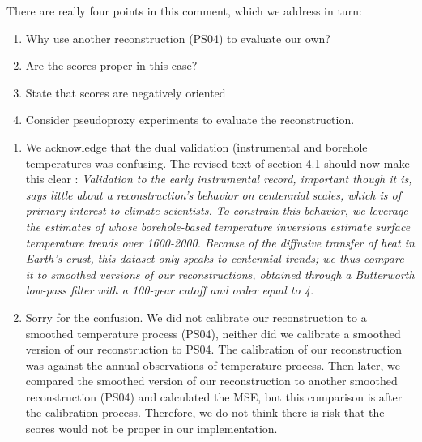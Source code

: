 \documentclass[11pt]{article}
\begin{document}
\begin{itemize}
There are really four points in this comment, which we address in turn:
\begin{enumerate}
\item Why use another reconstruction (PS04) to evaluate our own? 
\item Are the scores proper in this case? 
\item State that scores are negatively oriented
\item Consider pseudoproxy experiments to evaluate the reconstruction. 
\end{enumerate}
\begin{enumerate}
    \item  We acknowledge that the dual validation (instrumental and borehole temperatures was confusing. The revised text of section 4.1 should now make this clear : {\it Validation to the early instrumental record, important though it is, says little about a reconstruction's behavior on centennial scales, which is of primary interest to climate scientists. To constrain this behavior, we leverage the estimates of \citet[hereafter, PS04]{Pollack2004} whose borehole-based
temperature inversions estimate surface temperature trends over 1600-2000. Because of the diffusive transfer of heat in Earth's crust, this dataset only speaks to centennial trends; we thus compare it to smoothed versions of our reconstructions, obtained through a Butterworth low-pass filter with a 100-year cutoff and order equal to 4.} 
\item  Sorry for the confusion. We did not calibrate our reconstruction to a smoothed temperature process (PS04), neither did we calibrate a smoothed version of our reconstruction to PS04. The calibration of our reconstruction was against the annual observations of temperature process. Then later, we compared the smoothed version of our reconstruction to another smoothed reconstruction (PS04) and calculated the MSE, but this comparison is after the calibration process. Therefore, we do not think there is risk that the scores would not be proper in our implementation.%

\end{enumerate}
\end{itemize}
\end{document}
